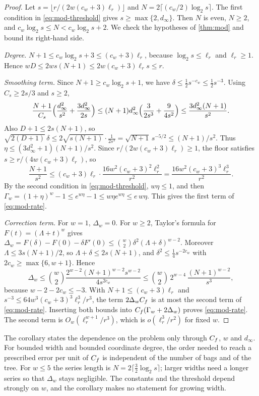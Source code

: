 \begin{proof}
Let $s=\lfloor r/(2w(c_w+3)\ell_r)\rfloor$ and
$N=2\lceil(c_w/2)\log_2s\rceil$. The first condition in
\eqref{eq:mod-threshold} gives $s\ge\max\{2,d_\infty\}$. Then $N$ is even,
$N\ge2$, and $c_w\log_2s\le N<c_w\log_2s+2$. We check the hypotheses of
\cref{thm:mod} and bound its right-hand side.

\emph{Degree.} $N+1\le c_w\log_2s+3\le(c_w+3)\ell_r$, because
$\log_2s\le\ell_r$ and $\ell_r\ge1$. Hence
$wD\le2ws(N+1)\le2w(c_w+3)\ell_rs\le r$.

\emph{Smoothing term.} Since $N+1\ge c_w\log_2s+1$, we have
$\delta\le\frac12s^{-c_w}\le\frac12s^{-3}$. Using $C_s\ge2s/3$ and $s\ge2$,
\[
  \frac{N+1}{C_s}\Bigl(\frac{d_\infty^2}{s^2}+\frac{3d_\infty^2}{2s}\Bigr)
  \le(N+1)d_\infty^2\Bigl(\frac3{2s^3}+\frac9{4s^2}\Bigr)
  \le\frac{3d_\infty^2(N+1)}{s^2}.
\]
Also $D+1\le2s(N+1)$, so
$\sqrt{2(D+1)}\,\delta\le2\sqrt{s(N+1)}\cdot\frac1{2s^3}=
\sqrt{N+1}\,s^{-5/2}\le(N+1)/s^2$. Thus
$\eta\le(3d_\infty^2+1)(N+1)/s^2$. Since $r/(2w(c_w+3)\ell_r)\ge1$, the
floor satisfies $s\ge r/(4w(c_w+3)\ell_r)$, so
\[
  \frac{N+1}{s^2}\le(c_w+3)\ell_r\cdot\frac{16w^2(c_w+3)^2\ell_r^2}{r^2}
  =\frac{16w^2(c_w+3)^3\ell_r^3}{r^2}.
\]
By the second condition in \eqref{eq:mod-threshold}, $w\eta\le1$, and then
$\Gamma_w=(1+\eta)^w-1\le e^{w\eta}-1\le w\eta e^{w\eta}\le e\,w\eta$. This
gives the first term of \eqref{eq:mod-rate}.

\emph{Correction term.} For $w=1$, $\Delta_w=0$. For $w\ge2$, Taylor's
formula for $F(t)=(\Lambda+t)^w$ gives
$\Delta_w=F(\delta)-F(0)-\delta F'(0)\le\binom w2\delta^2(\Lambda+\delta)^{w-2}$.
Moreover $\Lambda\le3s(N+1)/2$, so $\Lambda+\delta\le2s(N+1)$, and
$\delta^2\le\frac14s^{-2c_w}$ with $2c_w\ge\max\{6,w+1\}$. Hence
\[
  \Delta_w\le\binom w2\frac{2^{w-2}(N+1)^{w-2}s^{w-2}}{4s^{2c_w}}
  \le\binom w2\,2^{w-4}\,\frac{(N+1)^{w-2}}{s^3},
\]
because $w-2-2c_w\le-3$. With $N+1\le(c_w+3)\ell_r$ and
$s^{-3}\le64w^3(c_w+3)^3\ell_r^3/r^3$, the term $2\Delta_wC_f$ is at most
the second term of \eqref{eq:mod-rate}. Inserting both bounds into
$C_f(\Gamma_w+2\Delta_w)$ proves \eqref{eq:mod-rate}. The second term is
$O_w(\ell_r^{w+1}/r^3)$, which is $o(\ell_r^3/r^2)$ for fixed $w$.
\end{proof}

The corollary states the dependence on the problem only through $C_f$, $w$
and $d_\infty$. For bounded width and bounded coordinate degree, the order
needed to reach a prescribed error per unit of $C_f$ is independent of the
number of bags and of the tree. For $w\le5$ the series length is
$N=2\lceil\frac32\log_2s\rceil$; larger widths need a longer series so that
$\Delta_w$ stays negligible. The constants and the threshold depend
strongly on $w$, and the corollary makes no statement for growing width.

